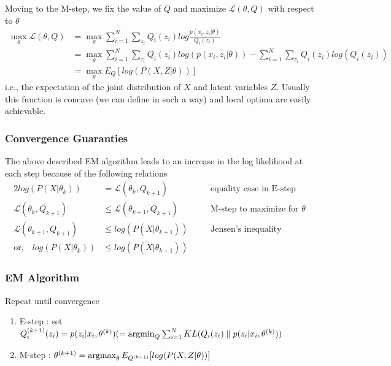 \documentclass[../statistical_learning_notes.tex]{subfiles}
\begin{document}
Moving to the M-step, we fix the value of $Q$ and maximize $\mathcal{L}(\theta, Q)$ with respect to $\theta$
\begin{align*}
    \max_{\theta}\mathcal{L}(\theta, Q) &= \max_{\theta} \sum_{i=1}^{N} \sum_{z_{i}} Q_{i}(z_{i}) log \frac{p(x_{i}, z_{i}|\theta)}{Q_{i}(z_{i})}\\
    &= \max_{\theta} \sum_{i=1}^{N} \sum_{z_{i}} Q_{i}(z_{i}) log(p(x_{i}, z_{i}|\theta)) - \sum_{i=1}^{N} \sum_{z_{i}} Q_{i}(z_{i})log(Q_{i}(z_{i}))\\
    &= \max_{\theta} E_{Q}[log(P(X, Z|\theta))]
\end{align*}
i.e., the expectation of the joint distribution of $X$ and latent variables $Z$. Usually this function is concave (we can define in such a way) and local optima are easily achievable.\newline

\subsubsection*{Convergence Guaranties}
The above described EM algorithm leads to an increase in the log likelihood at each step because of the following relations
\begin{alignat*}{2}
    log(P(X|\theta_{k})) &= \mathcal{L}(\theta_{k}, Q_{k+1}) \quad &&\text{equality case in E-step}\\
    \mathcal{L}(\theta_{k}, Q_{k+1}) &\leq \mathcal{L}(\theta_{k+1}, Q_{k+1}) \quad &&\text{M-step to maximize for $\theta$}\\
    \mathcal{L}(\theta_{k+1}, Q_{k+1}) &\leq log(P(X|\theta_{k+1})) \quad &&\text{Jensen's inequality}\\
    \text{or,} \quad log(P(X|\theta_{k})) &\leq log(P(X|\theta_{k+1}))
\end{alignat*}

\subsubsection*{EM Algorithm}
Repeat until convergence
\begin{enumerate}
    \item E-step : set $Q^{(k+1)}_{i}(z_{i}) = p(z_{i}|x_{i}, \theta^{(k)}) (= \operatorname*{argmin}_{Q} \sum_{i=1}^{N}KL(Q_{i}(z_{i}) \parallel p(z_{i}|x_{i}, \theta^{(k)}))$
    \item M-step : $\theta^{(k+1)} = \operatorname*{argmax}_{\theta} E_{Q^{(k+1)}}[log(P(X,Z|\theta))]$
\end{enumerate}
\end{document}
